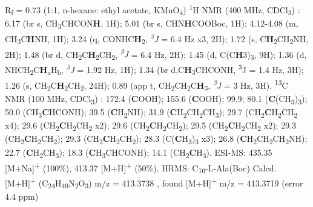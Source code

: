 R\textsubscript{f} = 0.73 (1:1, n-hexane: ethyl acetate, KMnO\textsubscript{4}) 
\newline
\textsuperscript{1}H NMR (400 MHz, CDCl\textsubscript{3}) \textdelta:
6.17 (br s, CH\textsubscript{3}CHCON\textbf{H}, 1H); 5.01 (br s, CHN\textbf{H}COOBoc, 1H); 4.12-4.08 (m, CH\textsubscript{3}C\textbf{H}NH, 1H);  3.24 (q, CONHC\textbf{H}\textsubscript{2}, \textit{\textsuperscript{3}J} = 6.4 Hz x3, 2H);  1.72 (s, C\textbf{H}\textsubscript{2}CH\textsubscript{2}NH, 2H); 1.48 (br d, CH\textsubscript{2}C\textbf{H}\textsubscript{2}CH\textsubscript{2}, \textit{\textsuperscript{3}J} = 6.4 Hz, 2H); 1.45 (d, C(C\textbf{H}3)\textsubscript{3},  9H); 1.36 (d, NHCH\textsubscript{2}C\textbf{H}\textsubscript{a}H\textsubscript{b}, \textit{\textsuperscript{3}J} = 1.92 Hz, 1H); 1.34 (br d,C\textbf{H}\textsubscript{3}CHCONH, \textsuperscript{3}J = 1.4 Hz, 3H); 1.26 (s, CH\textsubscript{2}C\textbf{H}\textsubscript{2}CH\textsubscript{2}, 24H); 0.89 (app t, CH\textsubscript{2}CH\textsubscript{2}C\textbf{H}\textsubscript{3}, \textit{\textsuperscript{3}J} = 3 Hz, 3H).
\newline
\textsuperscript{13}C NMR (100 MHz, CDCl\textsubscript{3}) \textdelta:
172.4 (\textbf{C}OOH); 155.6 (\textbf{C}OOH); 99.9; 80.1 (\textbf{C}(CH\textsubscript{3})\textsubscript{3}); 50.0 (CH\textsubscript{3}\textbf{C}HCONH); 39.5 (\textbf{C}H\textsubscript{2}NH); 31.9 (\textbf{C}H\textsubscript{2}CH\textsubscript{2}CH\textsubscript{3}); 29.7 (CH\textsubscript{2}\textbf{C}H\textsubscript{2}CH\textsubscript{2} x4); 29.6 (CH\textsubscript{2}\textbf{C}H\textsubscript{2}CH\textsubscript{2} x2); 29.6 (CH\textsubscript{2}\textbf{C}H\textsubscript{2}CH\textsubscript{2});  29.5 (CH\textsubscript{2}\textbf{C}H\textsubscript{2}CH\textsubscript{2} x2); 29.3 (CH\textsubscript{2}\textbf{C}H\textsubscript{2}CH\textsubscript{2}); 29.3 (CH\textsubscript{2}\textbf{C}H\textsubscript{2}CH\textsubscript{2}); 28.3 (C(\textbf{C}H\textsubscript{3})\textsubscript{3} x3); 26.8 (\textbf{C}H\textsubscript{2}CH\textsubscript{2}CH\textsubscript{2}NH); 22.7 (\textbf{C}H\textsubscript{2}CH\textsubscript{3}); 18.3 (\textbf{C}H\textsubscript{3}CHCONH); 14.1 (CH\textsubscript{2}\textbf{C}H\textsubscript{3}).
\newline
ESI-MS: 435.35 [M+Na]\textsuperscript{+} (100\%), 413.37 [M+H]\textsuperscript{+} (50\%).
\newline
HRMS: C\textsubscript{16}-L-Ala(Boc) Calcd. 
[M+H]\textsuperscript{+} (C\textsubscript{24}H\textsubscript{49}N\textsubscript{2}O\textsubscript{3}) m/z = 413.3738 , found [M+H]\textsuperscript{+} m/z = 413.3719 (error 4.4 ppm)
